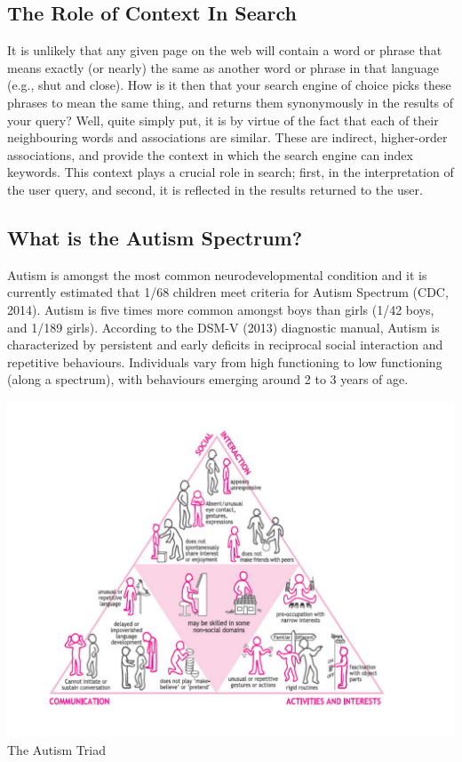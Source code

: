 \documentclass[10pt]{article}
\begin{document}
\subsection{The Role of Context In Search}
It is unlikely that any given page on the web will contain a word or phrase that means exactly (or nearly) the same as another word or phrase in that language (e.g., shut and close). How is it then that your search engine of choice picks these phrases to mean the same thing, and returns them synonymously in the results of your query? Well, quite simply put, it is by virtue of the fact that each of their neighbouring words and associations are similar. These are indirect, higher-order associations, and provide the context in which the search engine can index keywords. This context plays a crucial role in search; first, in the interpretation of the user query, and second, it is reflected in the results returned to the user.

\subsection{What is the Autism Spectrum?}
Autism is amongst the most common neurodevelopmental condition and it is currently estimated that 1/68 children meet criteria for Autism Spectrum (CDC, 2014). Autism is five times more common amongst boys than girls (1/42 boys, and 1/189 girls). According to the DSM-V (2013) diagnostic manual, Autism is characterized by persistent and early deficits in reciprocal social interaction and repetitive behaviours. Individuals vary from high functioning to low functioning (along a spectrum), with behaviours emerging around 2 to 3 years of age. 

\begin{center}
\includegraphics[scale=0.5]{asd}\\
The Autism Triad \cite{triad}
\end{center}
\end{document}
